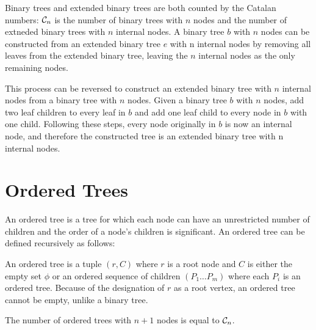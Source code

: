 Binary trees and extended binary trees are both counted by the Catalan numbers: $\mathcal{C}_n$ is the number of binary trees with $n$ nodes and the number of extneded binary trees with $n$ internal nodes.  
A binary tree $b$ with $n$ nodes can be constructed from an extended binary tree $e$ with n internal nodes by removing all leaves from the extended binary tree, leaving the $n$ internal nodes as the only remaining nodes.

This process can be reversed to construct an extended binary tree with $n$ internal nodes from a binary tree with $n$ nodes. Given a binary tree $b$ with $n$ nodes, add two leaf children to every leaf in $b$ and add one leaf child to every node in $b$ with one child. Following these steps, every node originally in $b$ is now an internal node, and therefore the constructed tree is an extended binary tree with n internal nodes.

\section{Ordered Trees}

An ordered tree is a tree for which each node can have an unrestricted number of children and the order of a node's children is significant.  An ordered tree can be defined recursively as follows:


An ordered tree is a tuple $(r,C)$ where $r$ is a root node and $C$ is either the empty set $\phi$ or an ordered sequence of children $(P_1\dots P_m)$ where each $P_i$ is an ordered tree.  Because of the designation of $r$ as a root vertex, an ordered tree cannot be empty, unlike a binary tree.

The number of ordered trees with $n+1$ nodes is equal to $\mathcal{C}_n$.

